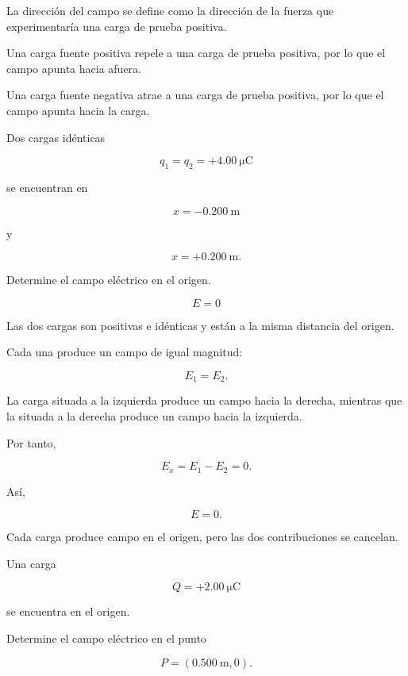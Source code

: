 \begin{explicacion}

La dirección del campo se define como la dirección de la fuerza que experimentaría una carga de prueba positiva.

Una carga fuente positiva repele a una carga de prueba positiva, por lo que el campo apunta hacia afuera.

Una carga fuente negativa atrae a una carga de prueba positiva, por lo que el campo apunta hacia la carga.

\end{explicacion}


\begin{ejercicio}

Dos cargas idénticas

\[
q_1=q_2=+\SI{4.00}{\micro\coulomb}
\]

se encuentran en

\[
x=-\SI{0.200}{\metre}
\]

y

\[
x=+\SI{0.200}{\metre}.
\]

Determine el campo eléctrico en el origen.

\end{ejercicio}

\begin{respuesta}

\[
\boxed{E=0}
\]

\end{respuesta}

\begin{explicacion}

Las dos cargas son positivas e idénticas y están a la misma distancia del origen.

Cada una produce un campo de igual magnitud:

\[
E_1=E_2.
\]

La carga situada a la izquierda produce un campo hacia la derecha, mientras que la situada a la derecha produce un campo hacia la izquierda.

Por tanto,

\[
E_x=E_1-E_2=0.
\]

Así,

\[
\boxed{E=0}.
\]

Cada carga produce campo en el origen, pero las dos contribuciones se cancelan.

\end{explicacion}


\begin{ejercicio}

Una carga

\[
Q=+\SI{2.00}{\micro\coulomb}
\]

se encuentra en el origen.

Determine el campo eléctrico en el punto

\[
P=(\SI{0.500}{\metre},0).
\]

\end{ejercicio}

